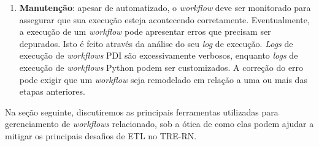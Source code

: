 \begin{enumerate}
\item \textbf{Manutenção}: apesar de automatizado,  o \textit{workflow} deve ser monitorado para assegurar que sua execução esteja acontecendo corretamente. Eventualmente, a execução de um \emph{workflow} pode apresentar erros que precisam ser depurados. Isto é feito através da análise do seu \emph{log} de execução. \emph{Logs} de execução de \emph{workflows} PDI são excessivamente verbosos, enquanto \textit{logs} de execução de \textit{workflows} Python podem ser customizados. A correção do erro pode exigir que um \emph{workflow} seja remodelado em relação a uma ou mais das etapas anteriores. 

\end{enumerate}

Na seção seguinte, discutiremos as principais ferramentas utilizadas para gerenciamento de \emph{workflows} relacionado, sob a ótica de como elas podem ajudar a mitigar os principais desafios de ETL no TRE-RN.

